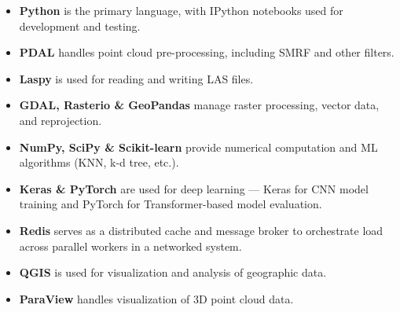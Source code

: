 \begin{itemize}
    \item \textbf{Python} is the primary language, with IPython notebooks used for development and testing.
    \item \textbf{PDAL} handles point cloud pre-processing, including SMRF and other filters.
    \item \textbf{Laspy} is used for reading and writing LAS files.
    \item \textbf{GDAL, Rasterio \& GeoPandas} manage raster processing, vector data, and reprojection.
    \item \textbf{NumPy, SciPy \& Scikit-learn} provide numerical computation and ML algorithms (KNN, k-d tree, etc.).
    \item \textbf{Keras \& PyTorch} are used for deep learning — Keras for CNN model training and PyTorch for Transformer-based model evaluation.
    \item \textbf{Redis} serves as a distributed cache and message broker to orchestrate load across parallel workers in a networked system.
    \item \textbf{QGIS} is used for visualization and analysis of geographic data.
    \item \textbf{ParaView} handles visualization of 3D point cloud data.
\end{itemize}


